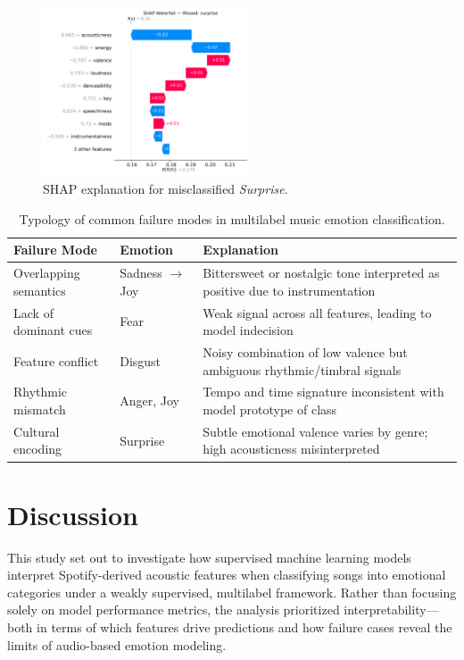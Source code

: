 \documentclass{article}
\begin{document}
\begin{figure}[H]
\centering
\includegraphics[width=0.55\textwidth]{Graphics/shap_missed_labels/surprise_missed_shap_waterfall.png}
\caption{SHAP explanation for misclassified \textit{Surprise}.}
\label{fig:shap_surprise}
\end{figure}

\begin{table}[H]
\centering
\begin{tabular}{|l|l|p{8.5cm}|}
\hline
\textbf{Failure Mode} & \textbf{Emotion} & \textbf{Explanation} \\
\hline
Overlapping semantics & Sadness $\rightarrow$ Joy & Bittersweet or nostalgic tone interpreted as positive due to instrumentation \\
Lack of dominant cues & Fear & Weak signal across all features, leading to model indecision \\
Feature conflict & Disgust & Noisy combination of low valence but ambiguous rhythmic/timbral signals \\
Rhythmic mismatch & Anger, Joy & Tempo and time signature inconsistent with model prototype of class \\
Cultural encoding & Surprise & Subtle emotional valence varies by genre; high acousticness misinterpreted \\
\hline
\end{tabular}
\caption{Typology of common failure modes in multilabel music emotion classification.}
\label{tab:failure_typology}
\end{table}


\section{Discussion}

This study set out to investigate how supervised machine learning models interpret Spotify-derived acoustic features when classifying songs into emotional categories under a weakly supervised, multilabel framework. Rather than focusing solely on model performance metrics, the analysis prioritized interpretability—both in terms of which features drive predictions and how failure cases reveal the limits of audio-based emotion modeling.
\end{document}
